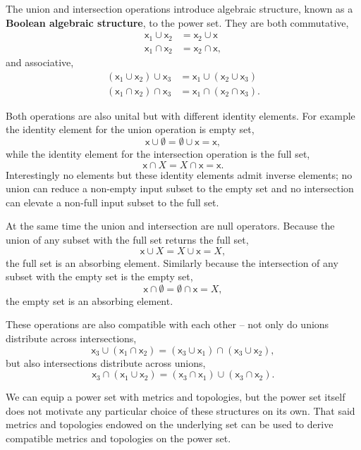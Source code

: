 \documentclass[
  letterpaper,
  DIV=11,
  numbers=noendperiod]{scrartcl}
\begin{document}
The union and intersection operations introduce algebraic structure,
known as a \textbf{Boolean algebraic structure}, to the power set. They
are both commutative, \begin{align*}
\mathsf{x}_{1} \cup \mathsf{x}_{2} &= \mathsf{x}_{2} \cup \mathsf{x}
\\
\mathsf{x}_{1} \cap \mathsf{x}_{2} &= \mathsf{x}_{2} \cap \mathsf{x},
\end{align*} and associative, \begin{align*}
(\mathsf{x}_{1} \cup \mathsf{x}_{2}) \cup \mathsf{x}_{3}
&=
\mathsf{x}_{1} \cup (\mathsf{x}_{2} \cup \mathsf{x}_{3})
\\
(\mathsf{x}_{1} \cap \mathsf{x}_{2}) \cap \mathsf{x}_{3}
&=
\mathsf{x}_{1} \cap (\mathsf{x}_{2} \cap \mathsf{x}_{3}).
\end{align*}

Both operations are also unital but with different identity elements.
For example the identity element for the union operation is empty set,
\[
\mathsf{x} \cup \emptyset = \emptyset \cup \mathsf{x} = \mathsf{x},
\] while the identity element for the intersection operation is the full
set, \[
\mathsf{x} \cap X = X \cap \mathsf{x} = \mathsf{x}.
\] Interestingly no elements but these identity elements admit inverse
elements; no union can reduce a non-empty input subset to the empty set
and no intersection can elevate a non-full input subset to the full set.

At the same time the union and intersection are null operators. Because
the union of any subset with the full set returns the full set, \[
\mathsf{x} \cup X = X \cup \mathsf{x} = X,
\] the full set is an absorbing element. Similarly because the
intersection of any subset with the empty set is the empty set, \[
\mathsf{x} \cap \emptyset = \emptyset \cap \mathsf{x} = X,
\] the empty set is an absorbing element.

These operations are also compatible with each other -- not only do
unions distribute across intersections, \[
\mathsf{x}_{3} \cup ( \mathsf{x}_{1} \cap \mathsf{x}_{2} )
=
(\mathsf{x}_{3} \cup \mathsf{x}_{1}) \cap (\mathsf{x}_{3} \cup \mathsf{x}_{2}),
\] but also intersections distribute across unions, \[
\mathsf{x}_{3} \cap ( \mathsf{x}_{1} \cup \mathsf{x}_{2} )
=
(\mathsf{x}_{3} \cap \mathsf{x}_{1}) \cup (\mathsf{x}_{3} \cap \mathsf{x}_{2}).
\]

We can equip a power set with metrics and topologies, but the power set
itself does not motivate any particular choice of these structures on
its own. That said metrics and topologies endowed on the underlying set
can be used to derive compatible metrics and topologies on the power
set.
\end{document}
